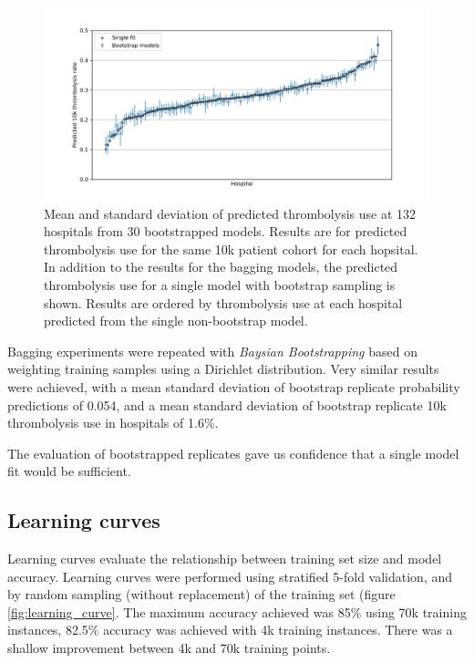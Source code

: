 \begin{figure}
\centering
\includegraphics[width=1\textwidth]{./images/50_bootstrap_10k_sd}
\caption{Mean and standard deviation of predicted thrombolysis use at 132 hospitals from 30 bootstrapped models. Results are for predicted thrombolysis use for the same 10k patient cohort for each hopsital. In addition to the results for the bagging models, the predicted thrombolysis use for a single model with bootstrap sampling is shown. Results are ordered by thrombolysis use at each hospital predicted from the single non-bootstrap model.}
\label{fig:bootstrap_2}
\end{figure}

Bagging experiments were repeated with \emph{Baysian Bootstrapping} based on weighting training samples using a Dirichlet distribution. Very similar results were achieved, with a mean standard deviation of bootstrap replicate probability predictions of 0.054, and a mean standard deviation of bootstrap replicate 10k thrombolysis use in hospitals of 1.6\%.

The evaluation of bootstrapped replicates gave us confidence that a single model fit would be sufficient. 



\subsection{Learning curves}

Learning curves evaluate the relationship between training set size and model accuracy. Learning curves were performed using stratified 5-fold validation, and by random sampling (without replacement) of the training set (figure \ref{fig:learning_curve}. The maximum accuracy achieved was 85\% using 70k training instances, 82.5\% accuracy was achieved with 4k training instances. There was a shallow improvement between 4k and 70k training points.

